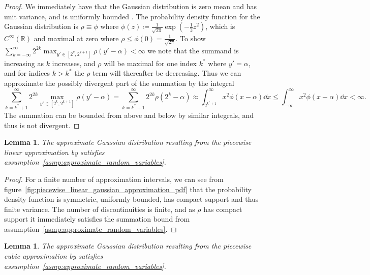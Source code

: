 \documentclass[9pt,a4paper,english]{extarticle}
\newtheorem{lemma}[theorem]{Lemma}
\begin{document}
\begin{proof}
We immediately have that the Gaussian distribution is zero mean and has unit variance, and is uniformly bounded \citep[appendix~C.2]{blundell2014concepts}. The probability density function for the Gaussian distribution is $ \rho \equiv \phi $ where $ \phi(z) \coloneqq \tfrac{1}{\sqrt{2\pi}} {\exp}(-\tfrac{1}{2}z^2) $, which is $ C^\infty(\mathbb{R}) $ and maximal at zero where $ \rho \leq \phi(0) = \tfrac{1}{\sqrt{2\pi}} $. To show $ \sum_{k=-\infty}^\infty 2^{2k} \max_{y'\in[2^{k}, 2^{k+1}]} \rho(y'-\alpha) < \infty $ we note that the summand is increasing as $ k $ increases, and $ \rho $ will be maximal for one index $ k^* $ where $ y' = \alpha $, and for indices $ k > k^* $ the $ \rho $ term will thereafter be decreasing. Thus we can approximate the possibly divergent part of the summation by the integral 
\begin{equation*}
\sum_{k=k^* + 1}^\infty 2^{2k} \max_{y'\in[2^{k}, 2^{k+1}]} \rho(y'-\alpha) = \sum_{k=k^* + 1}^\infty 2^{2k}  \rho(2^k-\alpha)
\approx \int_{2^{k^* + 1}}^\infty  x^2  \phi(x-\alpha) \dd{x}
\leq \int_{-\infty}^\infty  x^2  \phi(x-\alpha) \dd{x} < \infty.
\end{equation*}
The summation can be bounded from above and below by similar integrals, and thus is not divergent. 
\qedhere
\end{proof}

\begin{lemma}
\label{lemma:approximate_gaussian_distribution_linear}
The approximate Gaussian distribution resulting from the piecewise linear approximation by \citet{giles2020approximating} satisfies assumption~\ref{asmp:approximate_random_variables}.
\end{lemma}

\begin{proof}
For a finite number of approximation intervals, we can see from figure~\ref{fig:piecewise_linear_gaussian_approximation_pdf} that the probability density function is symmetric, uniformly bounded, has compact support and thus finite variance. The number of discontinuities is finite, and as $ \rho $ has compact support it immediately satisfies the summation bound from assumption~\ref{asmp:approximate_random_variables}. \qedhere
\end{proof}

\begin{lemma}
\label{lemma:approximate_gaussian_distribution_cubic}
The approximate Gaussian distribution resulting from the piecewise cubic approximation by \citet{giles2020approximating} satisfies assumption~\ref{asmp:approximate_random_variables}.
\end{lemma}
\end{document}

